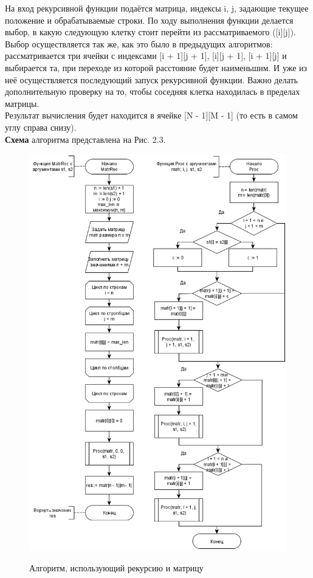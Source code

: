 \documentclass[12pt]{report}
\begin{document}
На вход рекурсивной функции подаётся матрица, индексы i, j, задающие текущее положение и обрабатываемые строки. По ходу выполнения функции делается выбор, в какую следующую клетку стоит перейти из рассматриваемого ([i][j]). Выбор осуществляется так же, как это было в предыдущих алгоритмов: рассматривается три ячейки с индексами [i + 1][j + 1], [i][j + 1], [i + 1][j] и выбирается та, при переходе из которой расстояние будет наименьшим. И уже из неё осуществляется последующий запуск рекурсивной функции. Важно делать дополнительную проверку на то, чтобы соседняя клетка находилась в пределах матрицы.\\

Результат вычисления будет находится в ячейке [N - 1][M - 1] (то есть в самом углу справа снизу).\\

\textbf{Схема} алгоритма представлена на Рис. 2.3.

\begin{figure}[h]
	\begin{center}
		{\includegraphics[scale = 0.61]{MatrRec_part2}}
		\caption{Алгоритм, использующий рекурсию и матрицу}
	\end{center}
\end{figure}
\end{document}
